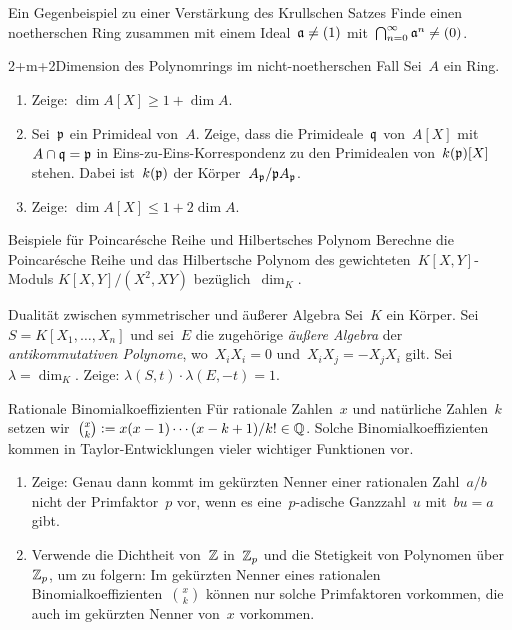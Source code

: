 \documentclass[entwurf]{uebblatt}
\begin{document}

\begin{aufgabe}{2}{Ein Gegenbeispiel zu einer Verstärkung des Krullschen Satzes}
Finde einen noetherschen Ring zusammen mit einem Ideal~$\mathfrak{a} \neq (1)$
mit~$\bigcap_{n=0}^\infty \mathfrak{a}^n \neq (0)$.
\end{aufgabe}

\begin{aufgabe}{2+m+2}{Dimension des Polynomrings im nicht-noetherschen Fall}
Sei~$A$ ein Ring.
\begin{enumerate}
\item Zeige: $\dim A[X] \geq 1 + \dim A$.
\item Sei~$\mathfrak{p}$ ein Primideal von~$A$. Zeige, dass die Primideale~$\mathfrak{q}$
von~$A[X]$ mit~$A \cap \mathfrak{q} = \mathfrak{p}$ in Eins-zu-Eins-Korrespondenz zu den
Primidealen von~$k(\mathfrak{p})[X]$ stehen. Dabei ist~$k(\mathfrak{p})$ der
Körper~$A_{\mathfrak{p}}/\mathfrak{p} A_{\mathfrak{p}}$.
\item Zeige: $\dim A[X] \leq 1 + 2 \dim A$.
\end{enumerate}
\end{aufgabe}

\begin{aufgabe}{3}{Beispiele für Poincarésche Reihe und Hilbertsches Polynom}
Berechne die Poincarésche Reihe und das Hilbertsche Polynom des
gewichteten~$K[X,Y]$-Moduls $K[X,Y]/(X^2, XY)$ bezüglich~$\dim_K$.
\end{aufgabe}

\begin{aufgabe}{1}{Dualität zwischen symmetrischer und äußerer Algebra}
Sei~$K$ ein Körper. Sei~$S = K[X_1,\ldots,X_n]$ und sei~$E$ die zugehörige \emph{äußere Algebra}
der \emph{antikommutativen Polynome}, wo~$X_i X_i = 0$ und~$X_i X_j =
-X_j X_i$ gilt. Sei~$\lambda = \dim_K$.
Zeige: $\lambda(S, t) \cdot \lambda(E, -t) = 1$.
\end{aufgabe}

\vfill

\begin{aufgabe}{0}{Rationale Binomialkoeffizienten}
\small
Für rationale Zahlen~$x$ und natürliche Zahlen~$k$ setzen wir~$\binom{x}{k}
\vcentcolon= x (x-1) \cdots (x-k+1) / k! \in \mathbb{Q}$. Solche Binomialkoeffizienten
kommen in Taylor-Entwicklungen vieler wichtiger Funktionen vor.
\begin{enumerate}
\item Zeige: Genau dann kommt im gekürzten Nenner einer rationalen Zahl~$a/b$
nicht der Primfaktor~$p$ vor, wenn es eine~$p$-adische Ganzzahl~$u$ mit~$bu = a$ gibt.
\item Verwende die Dichtheit von~$\mathbb{Z}$ in~$\mathbb{Z}_p$ und die Stetigkeit von
Polynomen über~$\mathbb{Z}_p$, um zu folgern: Im gekürzten Nenner eines rationalen
Binomialkoeffizienten~$\binom{x}{k}$ können nur solche Primfaktoren vorkommen, die auch
im gekürzten Nenner von~$x$ vorkommen.
\end{enumerate}
\end{aufgabe}
\end{document}
